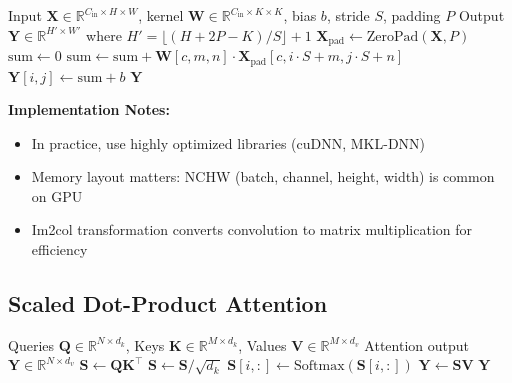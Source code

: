 \begin{algorithm}[H]
\caption{2D Convolution (Single Output Channel)}
\label{alg:conv2d}
\begin{algorithmic}[1]
\REQUIRE Input $\mathbf{X} \in \mathbb{R}^{C_{\text{in}} \times H \times W}$, kernel $\mathbf{W} \in \mathbb{R}^{C_{\text{in}} \times K \times K}$, bias $b$, stride $S$, padding $P$
\ENSURE Output $\mathbf{Y} \in \mathbb{R}^{H' \times W'}$ where $H' = \lfloor(H + 2P - K)/S\rfloor + 1$
\STATE $\mathbf{X}_{\text{pad}} \gets \text{ZeroPad}(\mathbf{X}, P)$ 
\STATE
{}
        \STATE $\text{sum} \gets 0$
                    \STATE $\text{sum} \gets \text{sum} + \mathbf{W}[c, m, n] \cdot \mathbf{X}_{\text{pad}}[c, i \cdot S + m, j \cdot S + n]$
                \ENDFOR
            \ENDFOR
        \ENDFOR
        \STATE $\mathbf{Y}[i, j] \gets \text{sum} + b$
    \ENDFOR
\ENDFOR
\RETURN $\mathbf{Y}$
\end{algorithmic}
\end{algorithm}

\textbf{Implementation Notes:}
\begin{itemize}
    \item In practice, use highly optimized libraries (cuDNN, MKL-DNN)
    \item Memory layout matters: NCHW (batch, channel, height, width) is common on GPU
    \item Im2col transformation converts convolution to matrix multiplication for efficiency
\end{itemize}

\subsection{Scaled Dot-Product Attention}

\begin{algorithm}[H]
\caption{Scaled Dot-Product Attention}
\label{alg:attention}
\begin{algorithmic}[1]
\REQUIRE Queries $\mathbf{Q} \in \mathbb{R}^{N \times d_k}$, Keys $\mathbf{K} \in \mathbb{R}^{M \times d_k}$, Values $\mathbf{V} \in \mathbb{R}^{M \times d_v}$
\ENSURE Attention output $\mathbf{Y} \in \mathbb{R}^{N \times d_v}$
\STATE {}
\STATE $\mathbf{S} \gets \mathbf{Q} \mathbf{K}^\top$ 
\STATE
\STATE {}
\STATE $\mathbf{S} \gets \mathbf{S} / \sqrt{d_k}$
\STATE
\STATE {}
    \STATE $\mathbf{S}[i, :] \gets \text{Softmax}(\mathbf{S}[i, :])$
\ENDFOR
\STATE {}
\STATE
\STATE {}
\STATE $\mathbf{Y} \gets \mathbf{S} \mathbf{V}$
\RETURN $\mathbf{Y}$
\end{algorithmic}
\end{algorithm}

